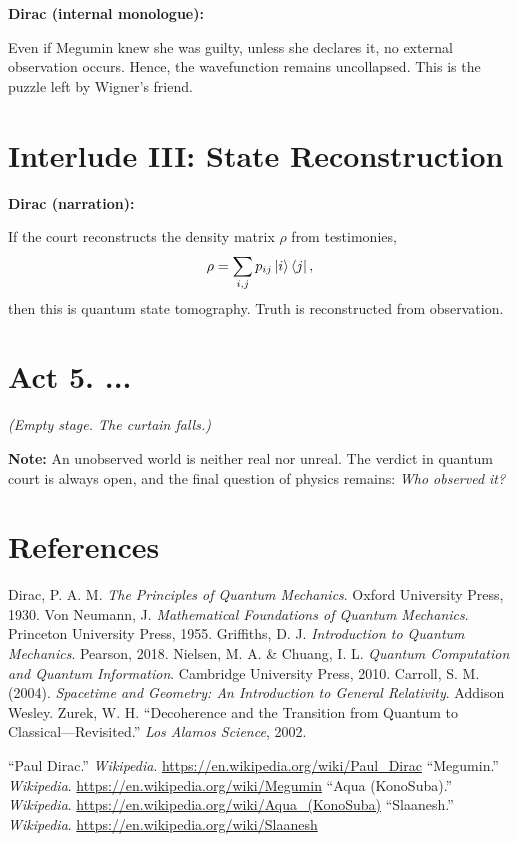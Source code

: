 \documentclass[12pt]{article}
\begin{document}
\textbf{Dirac (internal monologue):}

Even if Megumin knew she was guilty, unless she declares it, no external observation occurs. Hence, the wavefunction remains uncollapsed. This is the puzzle left by Wigner's friend\cite{Zurek2002}.

\section*{Interlude III: State Reconstruction}

\textbf{Dirac (narration):}

If the court reconstructs the density matrix $\rho$ from testimonies\cite{NielsenChuang2010},
\[
\rho = \sum_{i,j} p_{ij} \ket{i}\bra{j},
\]
then this is quantum state tomography. Truth is reconstructed from observation\cite{Zurek2002}.

\section*{Act 5. ...}

\textit{(Empty stage. The curtain falls.)}

\textbf{Note:} An unobserved world is neither real nor unreal. The verdict in quantum court is always open, and the final question of physics remains: \emph{Who observed it?}\cite{Carroll2004}

\newpage
\section*{References}
\begin{thebibliography}{10}
 Dirac, P. A. M. \textit{The Principles of Quantum Mechanics}. Oxford University Press, 1930.
 Von Neumann, J. \textit{Mathematical Foundations of Quantum Mechanics}. Princeton University Press, 1955.
 Griffiths, D. J. \textit{Introduction to Quantum Mechanics}. Pearson, 2018.
 Nielsen, M. A. \& Chuang, I. L. \textit{Quantum Computation and Quantum Information}. Cambridge University Press, 2010.
 Carroll, S. M. (2004). \textit{Spacetime and Geometry: An Introduction to General Relativity}. Addison Wesley.
 Zurek, W. H. ``Decoherence and the Transition from Quantum to Classical---Revisited.'' \textit{Los Alamos Science}, 2002.
 \raggedright ``Paul Dirac.'' \textit{Wikipedia}. \url{https://en.wikipedia.org/wiki/Paul_Dirac}
 ``Megumin.'' \textit{Wikipedia}. \url{https://en.wikipedia.org/wiki/Megumin}
 ``Aqua (KonoSuba).'' \textit{Wikipedia}. \url{https://en.wikipedia.org/wiki/Aqua_(KonoSuba)}
 ``Slaanesh.'' \textit{Wikipedia}. \url{https://en.wikipedia.org/wiki/Slaanesh}
\end{thebibliography}
\end{document}

